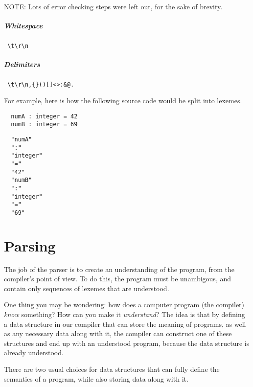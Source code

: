 \documentclass[
12pt,
letterpaper,
oneside,
]{memoir}
\begin{document}
NOTE: Lots of error checking steps were left out, for the sake of brevity.

\filbreak

\vspace{1em}
\begin{minipage}{\hsize}
  \paragraph{Whitespace} \verb| \t\r\n|
  \paragraph{Delimiters} \verb| \t\r\n,{}()[]<>:&@.|
\end{minipage}
\vspace{1em}

\filbreak

For example, here is how the following source code would be split into lexemes.

\begin{verbatim}
  numA : integer = 42
  numB : integer = 69
\end{verbatim}

\begin{verbatim}
  "numA"
  ":"
  "integer"
  "="
  "42"
  "numB"
  ":"
  "integer"
  "="
  "69"
\end{verbatim}

\chapter{Parsing}

The job of the parser is to create an understanding of the program, from the compiler's point of view. To do this, the program must be unambigous, and contain only sequences of lexemes that are understood.

One thing you may be wondering: how does a computer program (the compiler) \emph{know} something? How can you make it \emph{understand}? The idea is that by defining a data structure in our compiler that can store the meaning of programs, as well as any necessary data along with it, the compiler can construct one of these structures and end up with an understood program, because the data structure is already understood.

There are two usual choices for data structures that can fully define the semantics of a program, while also storing data along with it.
\end{document}
